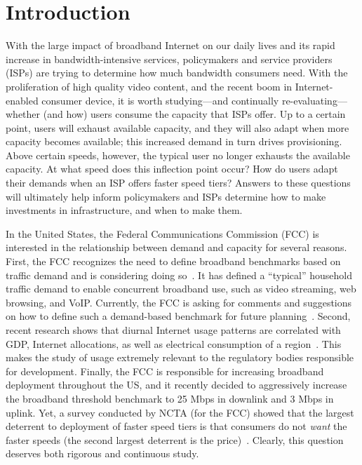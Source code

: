 \section{Introduction}\label{sec:introduction}

With the large impact of broadband Internet on our daily lives and its
rapid increase in bandwidth-intensive services, policymakers and service
providers (ISPs) are trying to determine how much bandwidth consumers
need. With the proliferation of high quality video content, and the
recent boom in Internet-enabled consumer device, it is worth
studying---and continually re-evaluating---whether (and how) users
consume the capacity that ISPs offer.  Up to a certain point, users will
exhaust available capacity, and they will also adapt when more capacity
becomes available; this increased demand in turn drives provisioning.
Above certain speeds, however, the typical user no longer exhausts the
available capacity. At what speed does this inflection point occur?  How
do users adapt their demands when an ISP offers faster speed tiers?
Answers to these questions will ultimately help inform policymakers and
ISPs determine how to make investments in infrastructure, and when to
make them.

In the United States, the Federal Communications Commission (FCC) is
interested in the relationship between demand and capacity for several
reasons.  First, the FCC recognizes the need to define broadband
benchmarks based on traffic demand and is considering doing
so~\cite{fcc2015broadband-report}. It has defined a ``typical''
household traffic demand to enable concurrent broadband use, such as
video streaming, web browsing, and VoIP. Currently, the FCC is asking
for comments and suggestions on how to define such a demand-based
benchmark for future planning~\cite{fcc2015progress-report,
  fcc2014progress-report}.  Second, recent research shows that diurnal
Internet usage patterns are correlated with GDP, Internet allocations,
as well as electrical consumption of a
region~\cite{ant-diurnal-web}. This makes the study of usage extremely
relevant to the regulatory bodies responsible for development.  Finally,
the FCC is responsible for increasing broadband deployment throughout
the US, and it recently decided to aggressively increase the broadband
threshold benchmark to 25 Mbps in downlink and 3 Mbps in uplink.  Yet, a
survey conducted by NCTA (for the FCC) showed that the largest deterrent
to deployment of faster speed tiers is that consumers do not \emph{want}
the faster speeds (the second largest deterrent is the
price)~\cite{fcc2015progress-report}. Clearly, this question deserves
both rigorous and continuous study.

